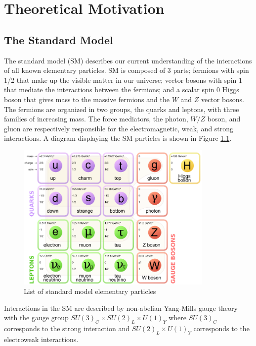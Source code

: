 
\chapter{Theoretical Motivation}
\label{chap:motivation}
\section{The Standard Model}

\indent  The standard model (SM) describes our current understanding of the interactions of all known elementary particles.  SM is composed of 3 parts; fermions with spin 1/2 that make up the visible matter in our universe; vector bosons with spin 1 that mediate the interactions between the fermions; and a scalar spin 0 Higgs boson that gives mass to the massive fermions and the $W$ and $Z$ vector bosons.  The fermions are organized in two groups, the quarks and leptons, with three families of increasing mass.  The force mediators, the photon, $W/Z$ boson, and gluon are respectively responsible for the electromagnetic, weak, and strong interactions.  A diagram displaying the SM particles is shown in Figure \ref{fig:SM:part}. \\

\begin{figure}[h!]
	\begin{center}
		\includegraphics[width=0.85\textwidth]{figures/theory/Standard_Model_of_Elementary_Particles.png}
		\caption{List of standard model elementary particles}
		\label{fig:SM:part}
	\end{center}
\end{figure}

\indent  Interactions in the SM are described by non-abelian Yang-Mills gauge theory with the gauge group $SU(3)_C \times SU(2)_L \times U(1)_Y$ where $SU(3)_C$ corresponds to the strong interaction and $SU(2)_L \times U(1)_Y$ corresponds to the electroweak interactions. 

